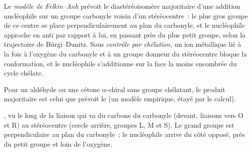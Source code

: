 \begin{definition}\label{def:b3:asymmetric-synthesis:felkin}
Le \emph{modèle de Felkin--Anh} prévoit le
diastéréoisomère majoritaire d'une addition nucléophile sur un groupe
carbonyle voisin d'un stéréocentre~: le plus gros groupe de ce centre se
place perpendiculairement au plan du carbonyle, et le nucléophile approche
en anti par rapport à lui, en passant près du plus petit groupe, selon la
trajectoire de Bürgi--Dunitz. Sous \emph{contrôle par chélation}, un
ion métallique lié à la fois à l'oxygène du carbonyle et à un groupe
donneur du stéréocentre bloque la conformation, et le nucléophile
s'additionne sur la face la moins encombrée du cycle chélate.
\end{definition}

\begin{proposition}\label{prop:b3:asymmetric-synthesis:felkin}
Pour un aldéhyde ou une cétone $\alpha$-chiral sans groupe chélatant, le produit majoritaire
est celui que prévoit le  (un modèle empirique,
étayé par le calcul). \admitted
\end{proposition}

\begin{omfigure}

{\small {}, vu le long de la liaison qui va du carbone du
carbonyle (devant, liaisons vers O et R) au stéréocentre (cercle arrière,
groupes L, M et S). Le grand groupe est perpendiculaire au plan du
carbonyle~; le nucléophile arrive du côté opposé, près du petit groupe et
loin de l'oxygène.}
\end{omfigure}

